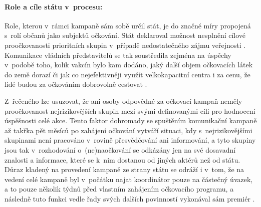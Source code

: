 \paragraph{Role a cíle státu v~procesu:} Role, kterou v~rámci kampaně sám sobě určil stát, je do značné míry propojená s~rolí občanů jako subjektů očkování. Stát deklaroval možnost nesplnění cílové proočkovanosti prioritních skupin v~případě nedostatečného zájmu veřejnosti \cite{kdoprvni}. Komunikace vládních představitelů se tak soustředila zejména na úspěchy v~podobě toho, kolik vakcín bylo kam dodáno, jaký další objem očkovacích látek do země dorazí či jak co nejefektivněji využít velkokapacitní centra i za cenu, že lidé budou za očkováním dobrovolně cestovat \cite{babis_echo}.

Z~řečeného lze usuzovat, že ani osoby odpovědné za očkovací kampaň neměly proočkovanost nejrizikovějších skupin mezi svými definovanými cíli pro hodnocení úspěšnosti celé akce. Tento faktor dohromady 
se spuštěním komunikační kampaně až takřka pět měsíců po zahájení očkování \cite{logoc_naruby,logoc_zpozdeni} vytváří situaci, kdy s~nejrizikovějšími skupinami není pracováno v~rovině přesvědčování ani informování, a tyto skupiny jsou tak v~rozhodování o~(ne)naočkování se odkázány jen na své dosavadní znalosti a informace, které se k~nim dostanou od jiných aktérů než od státu. Důraz kladený na provedení kampaně ze strany státu se odráží i v~tom, že na vedení celé kampaně byl v~počátku najat koordinátor pouze na částečný úvazek, a to pouze několik týdnů před vlastním zahájením očkovacího programu, a následně tuto funkci vedle řady svých dalších povinností vykonával sám premiér \cite{ocko_blahuta,babis_koordinator}. %










